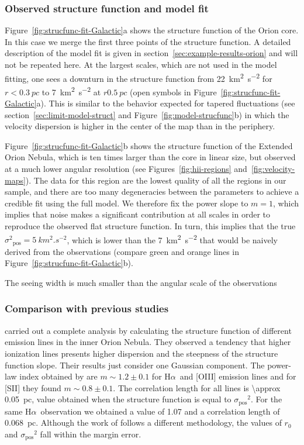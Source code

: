 \documentclass[fleqn,usenatbib, useAMS, a4paper]{mnras}
\newcommand\pos{\ensuremath{_{\mathrm{pos}}}}
\newcommand\halpha{H${\alpha}$}
\begin{document}
\subsubsection{Observed structure function and model fit}
\label{sec:observ-struct-funct-orion}

Figure~\ref{fig:strucfunc-fit-Galactic}a shows the structure function of the Orion core.
In this case we merge the first three points of the structure function.
A detailed description of the model fit is given in
section~\ref{sec:example-results-orion} and will
not be repeated here.
At the largest scales, which are not used in the model fitting,
one sees a downturn in the structure function from
\SI{22}{km^{2}.s^{-2}} for \(r < \SI{0.3}{pc}\) to
\SI{7}{km^{2}.s^{-2}} at \(r  \SI{0.5}{pc}\)
(open symbols in Figure~\ref{fig:strucfunc-fit-Galactic}a).
This is similar to the behavior expected for tapered fluctuations
(see section~\ref{sec:limit-model-struct} and Figure~\ref{fig:model-strucfunc}b)
in which the velocity dispersion is higher in the center of the map
than in the periphery.

Figure~\ref{fig:strucfunc-fit-Galactic}b shows the structure function of the Extended Orion Nebula, which is ten times larger than the core in linear size,
but observed at a much lower angular resolution
(see Figures~\ref{fig:hii-regions} and~\ref{fig:velocity-maps}).
The data for this region are the lowest quality of all the regions in
our sample, and there are too many degeneracies between the parameters
to achieve a credible fit using the full model.
We therefore fix the power slope to \(m = 1\),
which implies that noise makes a significant contribution at all scales
in order to reproduce the observed flat structure function.
In turn, this implies that the true \(\sigma^2\pos = \SI{5}{km^2.s^{-2}}\),
which is lower than the \SI{7}{km^2.s^{-2}}
that would be naively derived from the observations
(compare green and orange lines in Figure~\ref{fig:strucfunc-fit-Galactic}b).

The seeing width is much smaller than the angular scale of the observations
\subsubsection{Comparison with previous studies}
\label{sec:comparison-orion}

\citet{arthur2016turbulence} carried out a complete analysis by calculating the structure function of different emission lines in the inner Orion Nebula.
They observed a tendency that higher ionization lines presents higher  dispersion and the steepness of the structure function slope. 
Their results just consider one Gaussian component. 
The power-law index obtained by \citet{arthur2016turbulence} are \(m \sim 1.2 \pm 0.1\) for \halpha\ and [OIII] emission lines and for [SII] they found \(m \sim 0.8 \pm 0.1\). 
The correlation length for all lines is \SI{\approx 0.05}{pc}, value obtained when the structure function is equal to \(\sigma\pos^2\).
For the same \halpha\ observation we obtained a value of \num{1.07} and a correlation length of \SI{0.068}{pc}. 
Although the work of \citet{arthur2016turbulence} follows a different methodology, the values of \(r_0\) and \(\sigma\pos^2\) fall within the margin error.
\end{document}
